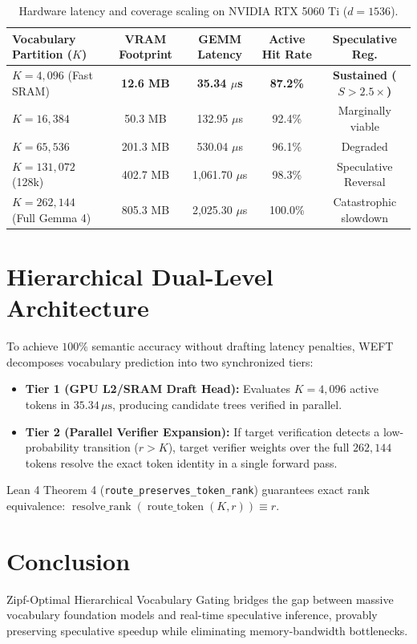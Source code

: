 \documentclass[11pt,a4paper]{article}
\begin{document}
\begin{table}[h]
\centering
\begin{tabular}{lcccc}
\toprule
\textbf{Vocabulary Partition ($K$)} & \textbf{VRAM Footprint} & \textbf{GEMM Latency} & \textbf{Active Hit Rate} & \textbf{Speculative Reg.} \\
\midrule
$K = 4,096$ (Fast SRAM) & \textbf{12.6 MB} & \textbf{35.34 $\mu$s} & \textbf{87.2\%} & \textbf{Sustained ($S > 2.5\times$)} \\
$K = 16,384$ & 50.3 MB & 132.95 $\mu$s & 92.4\% & Marginally viable \\
$K = 65,536$ & 201.3 MB & 530.04 $\mu$s & 96.1\% & Degraded \\
$K = 131,072$ (128k) & 402.7 MB & 1,061.70 $\mu$s & 98.3\% & Speculative Reversal \\
$K = 262,144$ (Full Gemma 4) & 805.3 MB & 2,025.30 $\mu$s & 100.0\% & Catastrophic slowdown \\
\bottomrule
\end{tabular}
\caption{Hardware latency and coverage scaling on NVIDIA RTX 5060 Ti ($d=1536$).}
\label{tab:vocab_bench}
\end{table}

\section{Hierarchical Dual-Level Architecture}
To achieve $100\%$ semantic accuracy without drafting latency penalties, WEFT decomposes vocabulary prediction into two synchronized tiers:
\begin{itemize}
    \item \textbf{Tier 1 (GPU L2/SRAM Draft Head):} Evaluates $K=4,096$ active tokens in $35.34\,\mu\text{s}$, producing candidate trees verified in parallel.
    \item \textbf{Tier 2 (Parallel Verifier Expansion):} If target verification detects a low-probability transition ($r > K$), target verifier weights over the full $262,144$ tokens resolve the exact token identity in a single forward pass.
\end{itemize}
Lean 4 Theorem 4 (\texttt{route\_preserves\_token\_rank}) guarantees exact rank equivalence: $\operatorname{resolve\_rank}(\operatorname{route\_token}(K, r)) \equiv r$.

\section{Conclusion}
Zipf-Optimal Hierarchical Vocabulary Gating bridges the gap between massive vocabulary foundation models and real-time speculative inference, provably preserving speculative speedup while eliminating memory-bandwidth bottlenecks.
\end{document}
